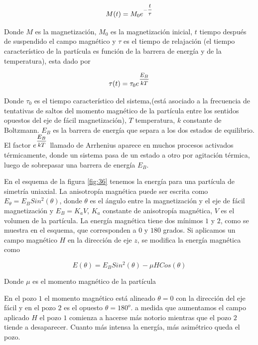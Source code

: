\begin{equation}
	M(t)=M_{0} e^{-\mfrac{t}{\tau}}
\end{equation}

Donde $M$ es la magnetización, $M_{0}$ es la magnetización inicial, $t$ tiempo después de suspendido el campo magnético
y $\tau$ es el tiempo de relajación (el tiempo característico de la partícula es función de la barrera de energía y de la temperatura), esta dado por

\begin{equation}
	\tau(t)=\tau_{0} e^{\mfrac{E_{B}}{kT}}
\end{equation}

Donde $\tau_{0}$ es el tiempo característico del sistema,(está asociado a la frecuencia de tentativas de saltos del momento magnético de la partícula entre los sentidos opuestos del eje de fácil magnetización), $T$ temperatura, $k$
constante de Boltzmann. $E_{B}$ es la barrera de energía que separa a los dos estados de equilibrio. El factor ${e^{\mfrac{E_{B}}{kT}}}$ llamado de Arrhenius aparece en muchos procesos activados térmicamente, donde un sistema pasa de un estado a otro por agitación térmica, luego de sobrepasar una barrera de energía $E_{B}$.

En el esquema de la figura \ref{fig:36} tenemos la energía para una partícula de simetría uniaxial. La anisotropía magnética puede ser escrita como $E_{\theta} = E_{B} Sin^{2}(\theta)$, donde $\theta$ es el ángulo entre la magnetización y el eje de fácil magnetización y $E_{B}=K_{a}V$, $K_{a}$ constante de anisotropía magnética, $V$ es el volumen de la partícula. La energía magnética tiene dos mínimos $1$ y $2$, como se muestra en el esquema, que corresponden a $0$ y $180$ grados. Si aplicamos un campo magnético $H$ en la dirección de eje $z$, se modifica la energía magnética como 

\begin{equation}
	E(\theta) = E_{B} Sin^{2}(\theta) - \mu H Cos(\theta)
\end{equation}


Donde $\mu$ es el momento magnético de la partícula 

En el pozo $1$ el momento magnético está alineado $\theta=0$ con la dirección del eje fácil y en el pozo $2$ es el opuesto $\theta=180^{o}$. a medida que aumentamos el campo aplicado $H$ el pozo $1$ comienza a hacerse más notorio mientras que el pozo $2$ tiende a desaparecer. Cuanto más intensa la energía, más asimétrico queda el pozo.

